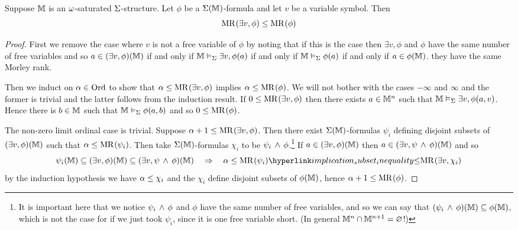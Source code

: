 \begin{prop}
    Suppose $\mathbb{M}$ is an $\omega$-saturated $\Sigma$-structure.
    Let $\phi$ be a $\Sigma(\mathbb{M})$-formula and let $v$ be a variable symbol.
    Then 
    \[\mathrm{MR}^{}(\exists v, \phi) \leq \mathrm{MR}^{}(\phi)\]
\end{prop}
\begin{proof}
    First we remove the case where $v$ is not a free variable of $\phi$ 
    by noting that if this is the case then $\exists v, \phi$ and $\phi$ 
    have the same number of free variables and so $a \in (\exists v, \phi)(\mathbb{M})$
    if and only if $\mathbb{M} \vDash_{\Sigma} \exists v, \phi(a)$ if and only if 
    $\mathbb{M} \vDash_{\Sigma} \phi(a)$ if and only if $a \in \phi(\mathbb{M})$.
    they have the same Morley rank.

    Then we induct on $\alpha \in \operatorname{Ord}$ to show that 
    $\alpha \leq \mathrm{MR}^{}(\exists v, \phi)$ implies $\alpha \leq \mathrm{MR}^{}(\phi)$.
    We will not bother with the cases $- \infty$ and $\infty$ and the former
    is trivial and the latter follows from the induction result.
    If $0 \leq \mathrm{MR}^{}(\exists v, \phi)$ then there exists $a \in \mathbb{M}^n$
    such that $\mathbb{M} \vDash_{\Sigma} \exists v, \phi(a,v)$. 
    Hence there is $b \in \mathbb{M}$ such that 
    $\mathbb{M} \vDash_{\Sigma} \phi(a,b)$ and so $0 \leq \mathrm{MR}^{}(\phi)$.

    The non-zero limit ordinal case is trivial. 
    Suppose $\alpha + 1 \leq \mathrm{MR}^{}(\exists v, \phi)$.
    Then there exist $\Sigma(\mathbb{M})$-formulas $\psi_i$ defining disjoint subsets of 
    $(\exists v, \phi) (\mathbb{M})$ such that $\alpha \leq \mathrm{MR}^{}(\psi_i)$.
    Then take $\Sigma(\mathbb{M})$-formulas $\chi_i$ to be $\psi_i \, \land \, \phi$.\footnote{
        It is important here that we notice $\psi_i \, \land \, \phi$ and 
        $\phi$ have the same number of free variables, and so we can say that 
        $(\psi_i \, \land \, \phi)(\mathbb{M}) \subseteq \phi(\mathbb{M})$, which is not the case for 
        if we just took $\psi_i$, since it is one free variable short.
        (In general $\mathbb{M}^n \cap \mathbb{M}^{n+1} = \varnothing$!)
        }
    If $a \in (\exists v, \phi)(\mathbb{M})$ then 
    $a \in (\exists v, \psi \, \land \, \phi)(\mathbb{M})$ and so 
    \[
        \psi_i(\M) \subs (\exists v, \phi)(\M) 
        \subs (\exists v, \psi \AND \phi)(\M) \quad \implies \quad
        \al \leq \MR{}{\psi_i} \linkto{implication_subset_inequality}{\leq} 
        \MR{}{\exists v, \chi_i}
    \]
    by the induction hypothesis we have $\alpha \leq \chi_i$ and the
    $\chi_i$ define disjoint subsets of $\phi(\mathbb{M})$, 
    hence $\alpha+1 \leq \mathrm{MR}^{}(\phi)$.
\end{proof}

